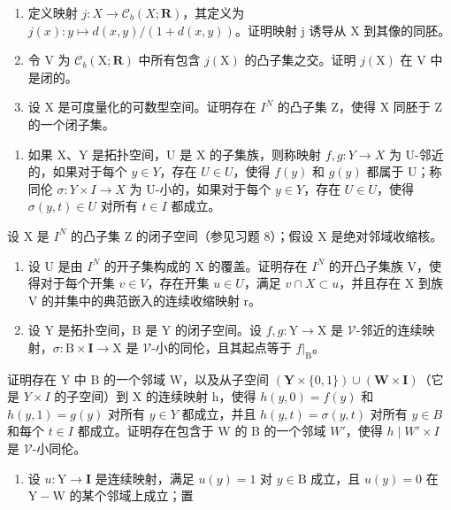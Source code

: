 \begin{enumerate}
\def\labelenumi{\alph{enumi})}
\item
  定义映射 \(j\colon X \to \mathcal{C}_{b}(X; \mathbf{R})\)，其定义为 \(j(x)\colon y \mapsto d(x, y)/(1 + d(x, y))\)。证明映射 j 诱导从 X 到其像的同胚。
\item
  令 V 为 \(\mathcal{C}_{b}(\mathrm{X};\mathbf{R})\) 中所有包含 \(j(\mathrm{X})\) 的凸子集之交。证明 \(j(\mathrm{X})\) 在 V 中是闭的。
\item
  设 X 是可度量化的可数型空间。证明存在 \(I^{N}\) 的凸子集 Z，使得 X 同胚于 Z 的一个闭子集。
\end{enumerate}

\begin{enumerate}
\def\labelenumi{\arabic{enumi})}
\setcounter{enumi}{8}
\tightlist
\item
  如果 X、Y 是拓扑空间，U 是 X 的子集族，则称映射 \(f, g: Y \to X\) 为 U-邻近的，如果对于每个 \(y \in Y\)，存在 \(U \in U\)，使得 \(f(y)\) 和 \(g(y)\) 都属于 U；称同伦 \(\sigma: Y \times I \to X\) 为 U-小的，如果对于每个 \(y \in Y\)，存在 \(U \in U\)，使得 \(\sigma(y, t) \in U\) 对所有 \(t \in I\) 都成立。
\end{enumerate}

设 X 是 \(I^{N}\) 的凸子集 Z 的闭子空间（参见习题 8）；假设 X 是绝对邻域收缩核。

\begin{enumerate}
\def\labelenumi{\alph{enumi})}
\item
  设 U 是由 \(I^{N}\) 的开子集构成的 X 的覆盖。证明存在 \(I^{N}\) 的开凸子集族 V，使得对于每个开集 \(v \in V\)，存在开集 \(u \in U\)，满足 \(v \cap X \subset u\)，并且存在 X 到族 V 的并集中的典范嵌入的连续收缩映射 r。
\item
  设 Y 是拓扑空间，B 是 Y 的闭子空间。设 \(f, g: \mathrm{Y} \to \mathrm{X}\) 是 \(\mathcal{V}\)-邻近的连续映射，\(\sigma: \mathrm{B} \times \mathbf{I} \to \mathrm{X}\) 是 \(\mathcal{V}\)-小的同伦，且其起点等于 \(f|_{\mathrm{B}}\)。
\end{enumerate}

  证明存在 Y 中 B 的一个邻域 W，以及从子空间 \((\mathbf{Y} \times \{0,1\}) \cup (\mathbf{W} \times \mathbf{I})\)（它是 \(Y \times I\) 的子空间）到 X 的连续映射 h，使得 \(h(y,0) = f(y)\) 和 \(h(y,1) = g(y)\) 对所有 \(y \in Y\) 都成立，并且 \(h(y,t) = \sigma(y,t)\) 对所有 \(y \in B\) 和每个 \(t \in I\) 都成立。证明存在包含于 W 的 B 的一个邻域 \(W'\)，使得 \(h \mid W' \times I\) 是 \(\mathcal{V}\)-小同伦。

\begin{enumerate}
\def\labelenumi{\alph{enumi})}
\setcounter{enumi}{2}
\tightlist
\item
  设 \(u \colon \mathrm{Y} \to \mathbf{I}\) 是连续映射，满足 \(u(y) = 1\) 对 \(y \in \mathrm{B}\) 成立，且 \(u(y) = 0\) 在 \(\mathrm{Y} - \mathrm{W}\) 的某个邻域上成立；置
\end{enumerate}

